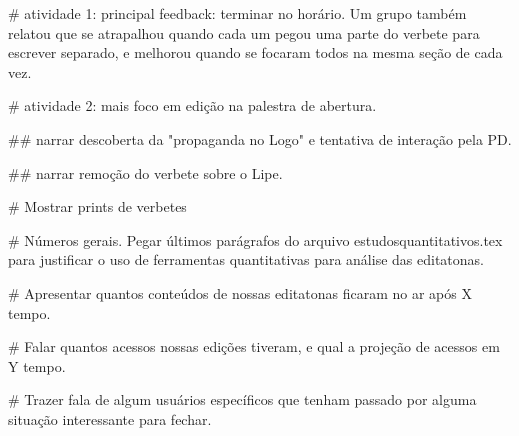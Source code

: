 # atividade 1: principal feedback: terminar no horário. Um grupo também relatou que se atrapalhou quando cada um pegou uma parte do verbete para escrever separado, e melhorou quando se focaram todos na mesma seção de cada vez.

# atividade 2: mais foco em edição na palestra de abertura.

## narrar descoberta da "propaganda no Logo" e tentativa de interação pela PD.

## narrar remoção do verbete sobre o Lipe.

# Mostrar prints de verbetes

# Números gerais. Pegar últimos parágrafos do arquivo estudosquantitativos.tex para justificar o uso de ferramentas quantitativas para análise das editatonas.

# Apresentar quantos conteúdos de nossas editatonas ficaram no ar após X tempo.

# Falar quantos acessos nossas edições tiveram, e qual a projeção de acessos em Y tempo.

# Trazer fala de algum usuários específicos que tenham passado por alguma situação interessante para fechar.